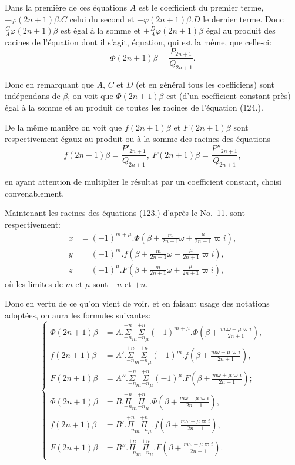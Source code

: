 \documentclass{article}
\begin{document}
Dans la première de ces équations $A$ est le coefficient du premier terme, $-\varphi(2n+1)\beta.C$ celui du second et $-\varphi(2n+1)\beta.D$ le dernier terme. Donc $\frac{C}{A}\varphi(2n+1)\beta$ est égal à la somme et $\pm\frac{D}{A}\varphi(2n+1)\beta$ égal au produit des racines de l'équation dont il s'agit, équation, qui est la même, que celle-ci:
\[ \Phi(2n+1)\beta=\frac{P_{2n+1}}{Q_{2n+1}}. \tag{124.} \]

Donc en remarquant que $A$, $C$ et $D$ (et en général tous les coefficiens) sont indépendans de $\beta$, on voit que $\Phi(2n+1)\beta$ est (d'un coefficient constant près) égal à la somme et au produit de toutes les racines de l'équation (124.).

De la même manière on voit que $f(2n+1)\beta$ et $F(2n+1)\beta$ sont respectivement égaux au produit ou à la somme des racines des équations
\[ f(2n+1)\beta=\frac{P'_{2n+1}}{Q_{2n+1}},\ F(2n+1)\beta=\frac{P''_{2n+1}}{Q_{2n+1}}, \]

en ayant attention de multiplier le résultat par un coefficient constant, choisi convenablement.

Maintenant les racines des équations (123.) d'après le No.\ 11. sont respectivement:
\[ \begin{aligned}
x&=(-1)^{m+\mu}.\Phi\left(\beta+\frac{m}{2n+1}\omega+\frac{\mu}{2n+1}\varpi i\right),\\
y&=(-1)^{m}.f\left(\beta+\frac{m}{2n+1}\omega+\frac{\mu}{2n+1}\varpi i\right),\\
z&=(-1)^{\mu}.F\left(\beta+\frac{m}{2n+1}\omega+\frac{\mu}{2n+1}\varpi i\right),
\end{aligned} \]
où les limites de $m$ et $\mu$ sont $-n$ et $+n$.

Donc en vertu de ce qu'on vient de voir, et en faisant usage des notations adoptées, on aura les formules suivantes:
\[ \left\{\begin{aligned}
\Phi(2n+1)\beta&=A.\overset{+n}{\underset{-n}{\Sigma}}_{m}\overset{+n}{\underset{-n}{\Sigma}}_{\mu}(-1)^{m+\mu}.\Phi\left(\beta+\frac{m.\omega+\mu\varpi i}{2n+1}\right),\\
f(2n+1)\beta&=A'.\overset{+n}{\underset{-n}{\Sigma}}_{m}\overset{+n}{\underset{-n}{\Sigma}}_{\mu}(-1)^{m}.f\left(\beta+\frac{m\omega+\mu\varpi i}{2n+1}\right),\\
F(2n+1)\beta&=A''.\overset{+n}{\underset{-n}{\Sigma}}_{m}\overset{+n}{\underset{-n}{\Sigma}}_{\mu}(-1)^{\mu}.F\left(\beta+\frac{m\omega+\mu\varpi i}{2n+1}\right);\\
\Phi(2n+1)\beta&=B.\overset{+n}{\underset{-n}{\Pi}}_{m}\overset{+n}{\underset{-n}{\Pi}}_{\mu}.\Phi\left(\beta+\frac{m\omega+\mu\varpi i}{2n+1}\right),\\
f(2n+1)\beta&=B'.\overset{+n}{\underset{-n}{\Pi}}_{m}\overset{+n}{\underset{-n}{\Pi}}_{\mu}.f\left(\beta+\frac{m\omega+\mu\varpi i}{2n+1}\right),\\
F(2n+1)\beta&=B''.\overset{+n}{\underset{-n}{\Pi}}_{m}\overset{+n}{\underset{-n}{\Pi}}_{\mu}.F\left(\beta+\frac{m\omega+\mu\varpi i}{2n+1}\right).
\end{aligned}\right. \tag{125.} \]
\end{document}
